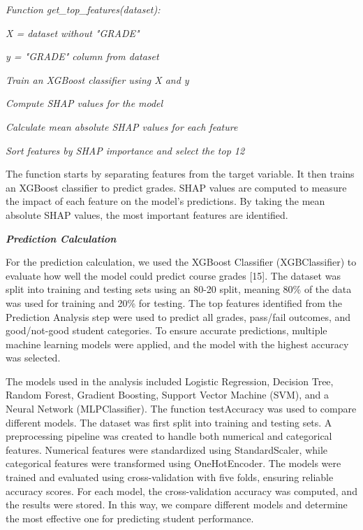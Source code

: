 \emph{Function get\_top\_features(dataset):}

\emph{X = dataset without "GRADE"}

\emph{y = "GRADE" column from dataset}

\emph{Train an XGBoost classifier using X and y}

\emph{Compute SHAP values for the model}

\emph{Calculate mean absolute SHAP values for each feature}

\emph{Sort features by SHAP importance and select the top 12}

\begin{multicols}{2}
The function starts by separating features from the target variable. It
then trains an XGBoost classifier to predict grades. SHAP values are
computed to measure the impact of each feature on the model's
predictions. By taking the mean absolute SHAP values, the most important
features are identified.

\emph{{\bfseries Prediction Calculation}}

For the prediction calculation, we used the XGBoost Classifier
(XGBClassifier) to evaluate how well the model could predict course
grades {[}15{]}. The dataset was split into training and testing sets
using an 80-20 split, meaning 80\% of the data was used for training and
20\% for testing. The top features identified from the Prediction
Analysis step were used to predict all grades, pass/fail outcomes, and
good/not-good student categories. To ensure accurate predictions,
multiple machine learning models were applied, and the model with the
highest accuracy was selected.

The models used in the analysis included Logistic Regression, Decision
Tree, Random Forest, Gradient Boosting, Support Vector Machine (SVM),
and a Neural Network (MLPClassifier). The function testAccuracy was used
to compare different models. The dataset was first split into training
and testing sets. A preprocessing pipeline was created to handle both
numerical and categorical features. Numerical features were standardized
using StandardScaler, while categorical features were transformed using
OneHotEncoder. The models were trained and evaluated using
cross-validation with five folds, ensuring reliable accuracy scores. For
each model, the cross-validation accuracy was computed, and the results
were stored. In this way, we compare different models and determine the
most effective one for predicting student performance.


\end{multicols}
